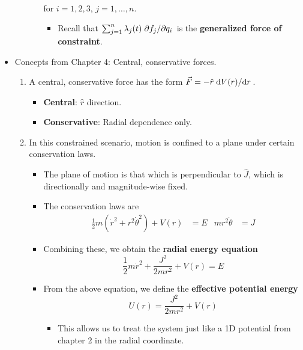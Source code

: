 \documentclass[../notes.tex]{subfiles}
\begin{document}
\begin{itemize}
\begin{enumerate}
\begin{itemize}
\begin{align*}
            \end{align*}
            for $i=1,2,3$, $j=1,\dots,n$.
            \begin{itemize}
                \item Recall that $\sum_{j=1}^n\lambda_j(t)\pdv*{f_j}{q_i}$ is the \textbf{generalized force of constraint}.
            \end{itemize}
        \end{itemize}
    \end{enumerate}
    \item Concepts from Chapter 4: Central, conservative forces.
    \begin{enumerate}
        \item A central, conservative force has the form $\vec{F}=-\hat{r}\dv*{V(r)}{r}$.
        \begin{itemize}
            \item \textbf{Central}: $\hat{r}$ direction.
            \item \textbf{Conservative}: Radial dependence only.
        \end{itemize}
        \item In this constrained scenario, motion is confined to a plane under certain conservation laws.
        \begin{itemize}
            \item The plane of motion is that which is perpendicular to $\hat{J}$, which is directionally and magnitude-wise fixed.
            \item The conservation laws are
            \begin{align*}
                \frac{1}{2}m(\dot{r}^2+r^2\dot{\theta}^2)+V(r) &= E&
                mr^2\dot{\theta} &= J
            \end{align*}
            \item Combining these, we obtain the \textbf{radial energy equation}
            \begin{equation*}
                \frac{1}{2}m\dot{r}^2+\frac{J^2}{2mr^2}+V(r) = E
            \end{equation*}
            \item From the above equation, we define the \textbf{effective potential energy}
            \begin{equation*}
                U(r) = \frac{J^2}{2mr^2}+V(r)
            \end{equation*}
            \begin{itemize}
                \item This allows us to treat the system just like a 1D potential from chapter 2 in the radial coordinate.

\end{itemize}
\end{itemize}
\end{enumerate}
\end{itemize}
\end{document}
